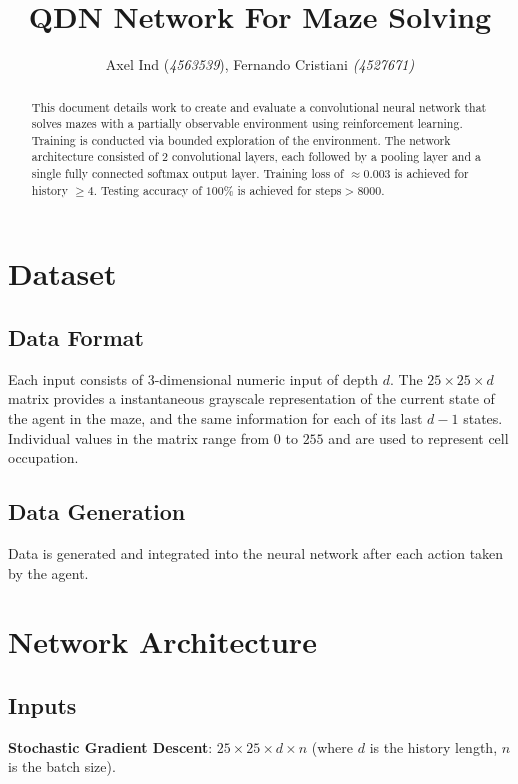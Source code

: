 \documentclass{article}
\begin{document}
\title{QDN Network For Maze Solving}
\author{Axel Ind (\textit{4563539}), Fernando Cristiani \textit{(4527671)}}

\maketitle

\begin{abstract}
This document details work to create and evaluate a convolutional neural network that solves mazes with a partially observable environment using reinforcement learning. Training is conducted via bounded exploration of the environment. The network architecture consisted of 2 convolutional layers, each followed by a pooling layer and a single fully connected softmax output layer. Training  loss of $\approx 0.003$ is achieved for history $\geq 4$. Testing accuracy of $100\%$ is achieved for steps$>8000$.
\end{abstract}

\section{Dataset}
\subsection{Data Format}
Each input consists of 3-dimensional numeric input of depth $d$. The $25\times 25\times d$ matrix provides a instantaneous grayscale representation of the current state of the agent in the maze, and the same information for each of its last $d-1$ states. Individual values in the matrix range from $0$ to $255$ and are used to represent cell occupation.
\subsection{Data Generation}
Data is generated and integrated into the neural network after each action taken by the agent.

\section{Network Architecture}
\subsection{Inputs}
\textbf{Stochastic Gradient Descent}: $25 \times 25 \times d \times n$ (where $d$ is the history length, $n$ is the batch size).
\end{document}
